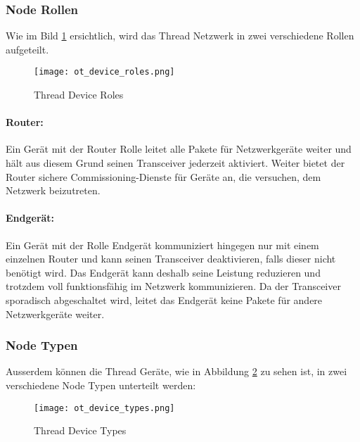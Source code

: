 \subsubsection{Node Rollen}\label{subsubsec:NodeRollen}
Wie im Bild \ref{fig:ThreadDeviceRoles} ersichtlich, wird das Thread Netzwerk in zwei verschiedene Rollen aufgeteilt. \cite[Seite 1-4]{thread_group_inc_thread_2017}

\begin{figure}[H]
	\centering
	\texttt{[image: ot\_device\_roles.png]}
	\caption{Thread Device Roles \cite{openthread_ot-primer-roles_2xpng_2016}}\label{fig:ThreadDeviceRoles}
\end{figure}

\paragraph{Router:}
Ein Gerät mit der Router Rolle leitet alle Pakete für Netzwerkgeräte weiter und hält aus diesem Grund seinen Transceiver jederzeit aktiviert. Weiter bietet der Router sichere Commissioning-Dienste für Geräte an, die versuchen, dem Netzwerk beizutreten. \cite[Seite 1-4]{thread_group_inc_thread_2017}

\paragraph{Endgerät:}
Ein Gerät mit der Rolle Endgerät kommuniziert hingegen nur mit einem einzelnen Router und kann seinen Transceiver deaktivieren, falls dieser nicht benötigt wird. Das Endgerät kann deshalb seine Leistung reduzieren und trotzdem voll funktionsfähig im Netzwerk kommunizieren. Da der Transceiver sporadisch abgeschaltet wird, leitet das Endgerät keine Pakete für andere Netzwerkgeräte weiter. \cite[Seite 1-4]{thread_group_inc_thread_2017}

\newpage
\subsubsection{Node Typen}\label{subsubsec:NodeTypen}
Ausserdem können die Thread Geräte, wie in Abbildung \ref{fig:ThreadDeviceTypes} zu sehen ist, in zwei verschiedene Node Typen unterteilt werden: \cite[Seite 1-4]{thread_group_inc_thread_2017}
\begin{figure}[H]
	\centering
	\texttt{[image: ot\_device\_types.png]}
	\caption{Thread Device Types \cite{openthread_ot-primer-taxonomy_2xpng_2016}}\label{fig:ThreadDeviceTypes}
\end{figure}

